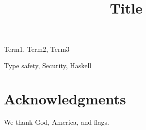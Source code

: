\documentclass{sigplanconf}
\begin{document}
\conferenceinfo{} {}
\CopyrightYear{}
\copyrightdata{}

\title{Title}
\authorinfo{}
           {}
           {}
\date{}

\maketitle



\category{}{}{}

\terms
Term1, Term2, Term3

\keywords
Type safety, Security, Haskell












\section*{Acknowledgments}
We thank God, America, and flags.

{%
  \frenchspacing
  
  
}
\end{document}
